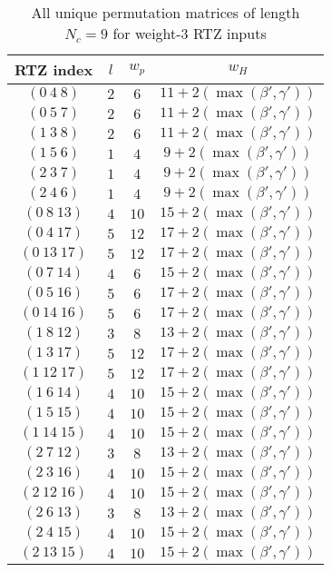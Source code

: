 \begin{table}
\centering
\begin{tabular}{||c |c  |c  |c |} 
 \hline
 RTZ index  & $ l$ & $w_p$& $w_H$\\
 \hline
 $(0~4~8)$ & $2$ & $6$ & $11+2(\max{(\beta',\gamma')})$\\
 \hline
 $(0~5~7)$ &  $2$ & $6$ &$11+2(\max{(\beta',\gamma')})$\\
 \hline
 $(1~3~8) $ &  $2$ & $6$ & $11+2(\max{(\beta',\gamma')})$\\
 \hline
 $(1~5~6) $ &  $1$ & $4$ & $9+2(\max{(\beta',\gamma')})$\\
 \hline
 $(2~3~7)$ & $1$ & $4$ & $9+2(\max{(\beta',\gamma')})$\\
 \hline
 $(2~4~6)$ & $1$ & $4$ & $9+2(\max{(\beta',\gamma')})$\\
 \hline\hline
  $(0~8~13)$ & $4$ & $10$ & $15+2(\max{(\beta',\gamma')})$\\
 \hline
 $(0~4~17)$ & $5$ & $12$ & $17+2(\max{(\beta',\gamma')})$\\
 \hline
 $(0~13~17)$ & $5$ & $12$ & $17+2(\max{(\beta',\gamma')})$\\
 \hline
  $(0~7~14)$ &  $4$ & $6$ &$15+2(\max{(\beta',\gamma')})$\\
 \hline
  $(0~5~16)$ &  $5$ & $6$ &$17+2(\max{(\beta',\gamma')})$\\
 \hline
  $(0~14~16)$ &  $5$ & $6$ &$17+2(\max{(\beta',\gamma')})$\\
 \hline
 $(1~8~12) $ &  $3$ & $8$ & $13+2(\max{(\beta',\gamma')})$\\
 \hline
 $(1~3~17) $ &  $5$ & $12$ & $17+2(\max{(\beta',\gamma')})$\\
 \hline
 $(1~12~17) $ & $5$ & $12$ & $17+2(\max{(\beta',\gamma')})$\\
 \hline
  $(1~6~14) $ &  $4$ & $10$ & $15+2(\max{(\beta',\gamma')})$\\
 \hline
  $(1~5~15)$ &  $4$ & $10$ & $15+2(\max{(\beta',\gamma')})$\\
 \hline
  $(1~14~15)$ &  $4$ & $10$ & $15+2(\max{(\beta',\gamma')})$\\
 \hline
 $(2~7~12)$ & $3$ & $8$ & $13+2(\max{(\beta',\gamma')})$\\
 \hline
 $(2~3~16)$ & $4$ & $10$ & $15+2(\max{(\beta',\gamma')})$\\
 \hline
 $(2~12~16)$ & $4$ & $10$ & $15+2(\max{(\beta',\gamma')})$\\
 \hline
  $(2~6~13)$ & $3$ & $8$ & $13+2(\max{(\beta',\gamma')})$\\
 \hline
  $(2~4~15)$ & $4$ & $10$ & $15+2(\max{(\beta',\gamma')})$\\
 \hline
  $(2~13~15)$ & $4$ & $10$ & $15+2(\max{(\beta',\gamma')})$\\
 \hline
\end{tabular}
\caption{All unique permutation matrices of length $N_c =9$ for weight-$3$ RTZ inputs}
\label{tb3}
\end{table}

